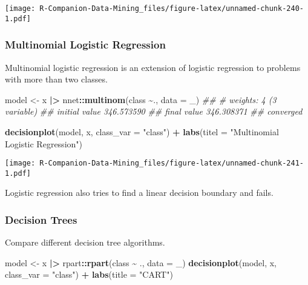 \documentclass[
  notitlepage]{book}
\newenvironment{Shaded}{\begin{snugshade}}{\end{snugshade}}
\newcommand{\CommentTok}[1]{\textcolor[rgb]{0.56,0.35,0.01}{\textit{#1}}}
\newcommand{\DataTypeTok}[1]{\textcolor[rgb]{0.13,0.29,0.53}{#1}}
\newcommand{\ErrorTok}[1]{\textcolor[rgb]{0.64,0.00,0.00}{\textbf{#1}}}
\newcommand{\KeywordTok}[1]{\textcolor[rgb]{0.13,0.29,0.53}{\textbf{#1}}}
\newcommand{\NormalTok}[1]{#1}
\newcommand{\OperatorTok}[1]{\textcolor[rgb]{0.81,0.36,0.00}{\textbf{#1}}}
\newcommand{\StringTok}[1]{\textcolor[rgb]{0.31,0.60,0.02}{#1}}
\begin{document}
\texttt{[image: R-Companion-Data-Mining\_files/figure-latex/unnamed-chunk-240-1.pdf]}

\hypertarget{multinomial-logistic-regression-1}{%
\subsubsection{Multinomial Logistic Regression}\label{multinomial-logistic-regression-1}}

Multinomial logistic regression is an extension of logistic regression
to problems with more than two classes.

\begin{Shaded}
\begin{Highlighting}[]
\NormalTok{model \textless{}{-}}\StringTok{ }\NormalTok{x }\OperatorTok{|}\ErrorTok{\textgreater{}}\StringTok{ }\NormalTok{nnet}\OperatorTok{::}\KeywordTok{multinom}\NormalTok{(class }\OperatorTok{\textasciitilde{}}\NormalTok{., }\DataTypeTok{data =}\NormalTok{ \_)}
\CommentTok{\#\# \# weights:  4 (3 variable)}
\CommentTok{\#\# initial  value 346.573590 }
\CommentTok{\#\# final  value 346.308371 }
\CommentTok{\#\# converged}
\end{Highlighting}
\end{Shaded}

\begin{Shaded}
\begin{Highlighting}[]
\KeywordTok{decisionplot}\NormalTok{(model, x, }\DataTypeTok{class\_var =} \StringTok{"class"}\NormalTok{) }\OperatorTok{+}\StringTok{ }
\StringTok{  }\KeywordTok{labs}\NormalTok{(}\DataTypeTok{titel =} \StringTok{"Multinomial Logistic Regression"}\NormalTok{)}
\end{Highlighting}
\end{Shaded}

\texttt{[image: R-Companion-Data-Mining\_files/figure-latex/unnamed-chunk-241-1.pdf]}

Logistic regression also tries to find a linear
decision boundary and fails.

\hypertarget{decision-trees-1}{%
\subsubsection{Decision Trees}\label{decision-trees-1}}

Compare different decision tree algorithms.

\begin{Shaded}
\begin{Highlighting}[]
\NormalTok{model \textless{}{-}}\StringTok{ }\NormalTok{x }\OperatorTok{|}\ErrorTok{\textgreater{}}\StringTok{ }\NormalTok{rpart}\OperatorTok{::}\KeywordTok{rpart}\NormalTok{(class }\OperatorTok{\textasciitilde{}}\StringTok{ }\NormalTok{., }\DataTypeTok{data =}\NormalTok{ \_)}
\KeywordTok{decisionplot}\NormalTok{(model, x, }\DataTypeTok{class\_var =} \StringTok{"class"}\NormalTok{) }\OperatorTok{+}\StringTok{ }
\StringTok{  }\KeywordTok{labs}\NormalTok{(}\DataTypeTok{title =} \StringTok{"CART"}\NormalTok{)}
\end{Highlighting}
\end{Shaded}
\end{document}
